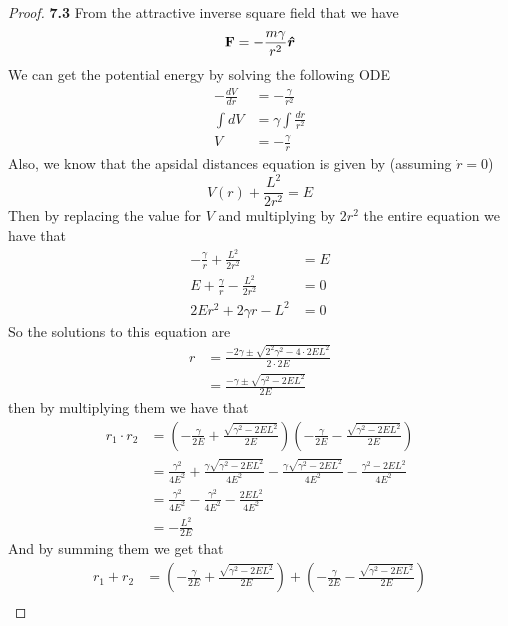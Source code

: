 \documentclass[11pt]{article}
\newcommand{\hatr}{\bm{\hat{r}}}
\theoremstyle{definition}
\begin{document}
	\begin{proof}{\textbf{7.3}}
        From the attractive inverse square field that we have
        $$\vectorbold{F} = -\frac{m\gamma}{r^2} \hatr$$
        We can get the potential energy by solving the following ODE
        \begin{align*}
            -\frac{dV}{dr} &= -\frac{\gamma}{r^2}\\
            \int dV &= \gamma \int \frac{dr}{r^2}\\
            V &= -\frac{\gamma}{r}
        \end{align*}
        Also, we know that the apsidal distances equation is given by (assuming
        $\dot{r} = 0$)
        $$V(r) + \frac{L^2}{2r^2} = E$$
        Then by replacing the value for $V$ and multiplying by $2r^2$ the entire
        equation we have that
        \begin{align*}
            -\frac{\gamma}{r} + \frac{L^2}{2r^2} &= E\\
            E + \frac{\gamma}{r} - \frac{L^2}{2r^2} &= 0 \\
            2Er^2 + 2\gamma r - L^2 &= 0
        \end{align*}
        So the solutions to this equation are
        \begin{align*}
            r &= \frac{-2\gamma \pm \sqrt{2^2\gamma^2 - 4 \cdot 2EL^2}}{2\cdot 2E}\\
              &= \frac{-\gamma \pm \sqrt{\gamma^2 - 2EL^2}}{2E}
        \end{align*}
        then by multiplying them we have that
        \begin{align*}
            r_1 \cdot r_2 &= 
            (-\frac{\gamma}{2E} + \frac{\sqrt{\gamma^2 - 2EL^2}}{2E})(-\frac{\gamma}{2E} -  \frac{\sqrt{\gamma^2 - 2EL^2}}{2E})\\
                &= \frac{\gamma^2}{4E^2} + \frac{\gamma\sqrt{\gamma^2 - 2EL^2}}{4E^2} - \frac{\gamma\sqrt{\gamma^2 - 2EL^2}}{4E^2} - \frac{\gamma^2 - 2EL^2}{4E^2}\\
                &= \frac{\gamma^2}{4E^2} - \frac{\gamma^2}{4E^2} - \frac{2EL^2}{4E^2}\\
                &= - \frac{L^2}{2E}
        \end{align*}
        And by summing them we get that 
        \begin{align*}
            r_1 + r_2 &= 
            (-\frac{\gamma}{2E} + \frac{\sqrt{\gamma^2 - 2EL^2}}{2E}) + (-\frac{\gamma}{2E} -  \frac{\sqrt{\gamma^2 - 2EL^2}}{2E})\\

\end{align*}
\end{proof}
\end{document}
